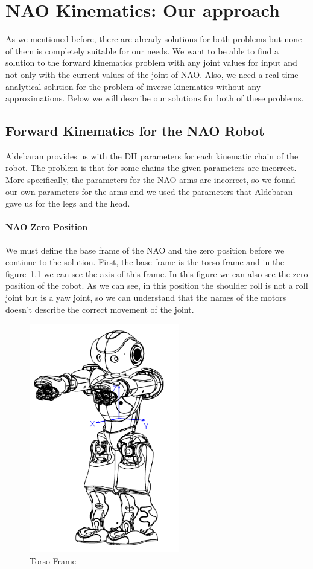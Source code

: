 \chapter{NAO Kinematics: Our approach}
\label{approach}
As we mentioned before, there are already solutions for both problems but none of them is completely suitable for our needs. We want to be able to find a solution to the forward kinematics problem with any joint values for input and not only with the current values of the joint of NAO. Also, we need a real-time analytical solution for the problem of inverse kinematics without any approximations. Below we will describe our solutions for both of these problems.
\section{Forward Kinematics for the NAO Robot}
Aldebaran provides us with the DH parameters for each kinematic chain of the robot. The problem is that for some chains the given parameters are incorrect. More specifically, the parameters for the NAO arms are incorrect, so we found our own parameters for the arms and we used the parameters that Aldebaran gave us for the legs and the head.


\subsubsection*{NAO Zero Position}
We must define the base frame of the NAO and the zero position before we continue to the solution. First, the base frame is the torso frame and in the figure~\ref{fig:torso} we can see the axis of this frame. In this figure we can also see the zero position of the robot. As we can see, in this position the shoulder roll is not a roll joint but is a yaw joint, so we can understand that the names of the motors doesn't describe the correct movement of the joint.

\begin{figure}[h]
	\begin{center}
		\includegraphics[height = 10cm]{Figures/torso_frame.png}
 		\caption{Torso Frame}
 		\label{fig:torso}
	\end{center}
\end{figure}


